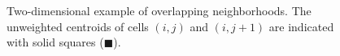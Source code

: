 \begin{figure}
	\centering
	\qquad
	\caption{\sf Two-dimensional example of overlapping neighborhoods.  The unweighted centroids of cells $(i,j)$ and $(i,j+1)$ are indicated with solid squares ($\blacksquare$).} \label{fig:2nborTile}
\end{figure}




